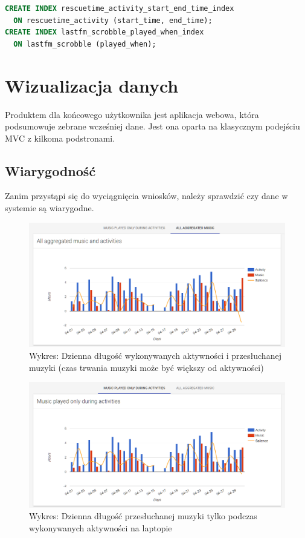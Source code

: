\documentclass[brudnopis]{xmgr}
\begin{document}
\begin{lstlisting}[language=sql]
CREATE INDEX rescuetime_activity_start_end_time_index
  ON rescuetime_activity (start_time, end_time);
CREATE INDEX lastfm_scrobble_played_when_index
  ON lastfm_scrobble (played_when);
\end{lstlisting}

\chapter{Wizualizacja danych}

    Produktem dla końcowego użytkownika jest aplikacja webowa, która podsumowuje zebrane wcześniej dane.
    Jest ona oparta na klasycznym podejściu MVC z kilkoma podstronami.

    \section{Wiarygodność}

    Zanim przystąpi się do wyciągnięcia wniosków, należy sprawdzić czy dane w systemie są wiarygodne.

    \begin{figure}
        \includegraphics[width=\linewidth]{fig/ui/chart-music-all.png}
        \caption{Wykres: Dzienna długość wykonywanych aktywności i przesłuchanej muzyki (czas trwania muzyki może być większy od aktywności)}
        \label{fig:ui:chart-music-all}
    \end{figure}

    \begin{figure}
        \includegraphics[width=\linewidth]{fig/ui/chart-music-only-during-activities.png}
        \caption{Wykres: Dzienna długość przesłuchanej muzyki tylko podczas wykonywanych aktywności na laptopie}
        \label{fig:ui:chart-music-only-during-activities}
    \end{figure}
\end{document}
